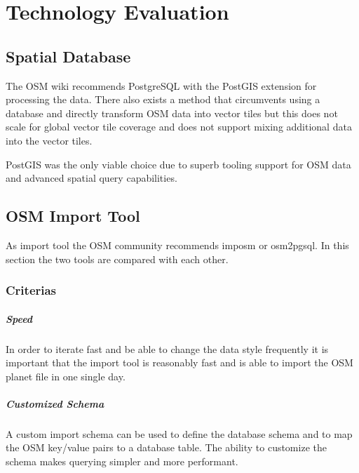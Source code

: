 \chapter{Technology Evaluation}\label{technology_evaluation}

\section{Spatial Database}\label{spatial_database}

The OSM wiki\cite{1_wiki.openstreetmap.org_2015} recommends PostgreSQL with the PostGIS extension for processing the data. There also exists a method\cite{2_github_2015} that circumvents using a database and directly transform OSM data into vector tiles but this does not scale for global vector tile coverage and does not support mixing additional data into the vector tiles.

\begin{tcolorbox}[arc=0mm,boxrule=1pt,title=Decision]\label{spatial_db_decision}
PostGIS was the only viable choice due to superb tooling support for OSM data and
advanced spatial query capabilities.
\end{tcolorbox}

\section{OSM Import Tool}\label{osm_import_tool}
As import tool the OSM community recommends imposm\cite{3_imposm.org_2015} or osm2pgsql\cite{4_wiki.openstreetmap.org_2015}.
In this section the two tools are compared with each other.

\subsection{Criterias}\label{criterias}

\paragraph{Speed} 
In order to iterate fast and be able to change the data style frequently
it is important that the import tool is reasonably fast and is able
to import the OSM planet file in one single day.

\paragraph{Customized Schema}
A custom import schema can be used to define the database schema and to map the OSM key/value pairs to a database table.
The ability to customize the schema
makes querying simpler and more performant.

